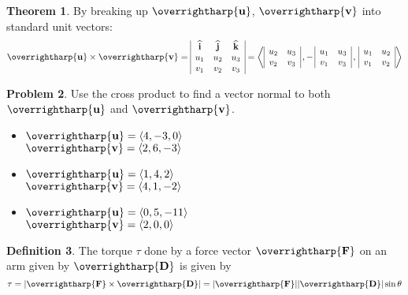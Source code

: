 \documentclass[letterpaper, twoside, 12pt]{book}
\newcommand{\<}{\langle}
\renewcommand{\>}{\rangle}
\theoremstyle{definition}
\newtheorem{theorem}{Theorem}
\theoremstyle{definition}
\newtheorem{definition}[theorem]{Definition}
\newtheorem{problem}[theorem]{Problem}
\newcommand{\harpvec}[1]{\overrightharp{\ensuremath{\mathbf{#1}}}}
\newcommand{\veci}{\ensuremath{\mathbf{\widehat{i}}}}
\newcommand{\vecj}{\ensuremath{\mathbf{\widehat{j}}}}
\newcommand{\veck}{\ensuremath{\mathbf{\widehat{k}}}}
\begin{document}
  \begin{theorem}
    By breaking up $\harpvec{u}$, $\harpvec{v}$ into standard unit vectors:
    \[
    \harpvec{u} \times \harpvec{v}
      =
    \begin{array}{|c c c|}
    \veci & \vecj & \veck \\
    u_1 & u_2 & u_3 \\
    v_1 & v_2 & v_3 \\
    \end{array}
      =
    \left\<
      \begin{array}{|c c|}
      u_2 & u_3 \\
      v_2 & v_3 \\
      \end{array}
        \,,-\,
      \begin{array}{|c c|}
      u_1 & u_3 \\
      v_1 & v_3 \\
      \end{array}
        \,,\,
      \begin{array}{|c c|}
      u_1 & u_2 \\
      v_1 & v_2 \\
      \end{array}
    \right\>
    \]
  \end{theorem}

\begin{problem}
  Use the cross product to find a vector normal to both $\harpvec{u}$
  and $\harpvec{v}$.
    \begin{itemize}
      \item $\harpvec{u}=\<4,-3,0\>$\\ $\harpvec{v}=\<2,6,-3\>$
      \item $\harpvec{u}=\<1,4,2\>$\\ $\harpvec{v}=\<4,1,-2\>$
      \item $\harpvec{u}=\<0,5,-11\>$\\ $\harpvec{v}=\<2,0,0\>$
    \end{itemize}
\end{problem}

\vfill

\begin{definition}
  The torque $\tau$ done by a force vector $\harpvec{F}$ on an arm given by
  $\harpvec{D}$ is given by
  \[
    \tau = |\harpvec{F} \times \harpvec{D}|
      =
    |\harpvec{F}||\harpvec{D}|\sin \theta
  \]
\end{definition}
\end{document}
